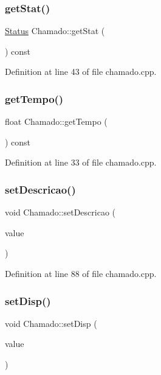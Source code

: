 \subsubsection{\texorpdfstring{get\+Stat()}{getStat()}}
{\footnotesize\ttfamily \hyperlink{class_status}{Status} Chamado\+::get\+Stat (\begin{DoxyParamCaption}{ }\end{DoxyParamCaption}) const}



Definition at line 43 of file chamado.\+cpp.

\hypertarget{class_chamado_abbe9ba6e55ea448b02e9c091369c1d2a}{}\label{class_chamado_abbe9ba6e55ea448b02e9c091369c1d2a} 
\subsubsection{\texorpdfstring{get\+Tempo()}{getTempo()}}
{\footnotesize\ttfamily float Chamado\+::get\+Tempo (\begin{DoxyParamCaption}{ }\end{DoxyParamCaption}) const}



Definition at line 33 of file chamado.\+cpp.

\hypertarget{class_chamado_a970a71741ec450c40c48eb4babd2fec3}{}\label{class_chamado_a970a71741ec450c40c48eb4babd2fec3} 
\subsubsection{\texorpdfstring{set\+Descricao()}{setDescricao()}}
{\footnotesize\ttfamily void Chamado\+::set\+Descricao (\begin{DoxyParamCaption}\item[{const Q\+String \&}]{value }\end{DoxyParamCaption})}



Definition at line 88 of file chamado.\+cpp.

\hypertarget{class_chamado_aedfd2171f66178c80462e0477b49a0f0}{}\label{class_chamado_aedfd2171f66178c80462e0477b49a0f0} 
\subsubsection{\texorpdfstring{set\+Disp()}{setDisp()}}
{\footnotesize\ttfamily void Chamado\+::set\+Disp (\begin{DoxyParamCaption}\item[{const \hyperlink{class_dispositivo}{Dispositivo} \&}]{value }\end{DoxyParamCaption})}



